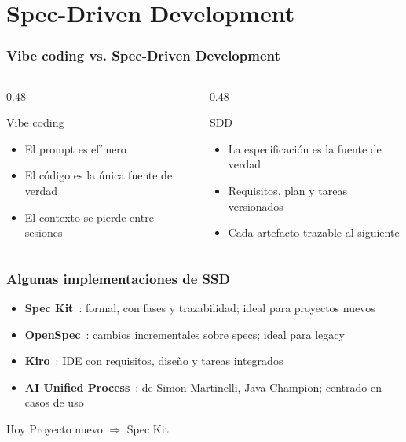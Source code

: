 \section[SDD]{Spec-Driven Development}

\begin{frame}
    \frametitle{Vibe coding vs. Spec-Driven Development}
    \begin{columns}[T]
        \begin{column}{0.48\textwidth}
            \begin{block}{Vibe coding}
                \begin{itemize}
                    \item El prompt es efímero
                    \item El código es la única fuente de verdad
                    \item El contexto se pierde entre sesiones
                \end{itemize}
            \end{block}
        \end{column}
        \begin{column}{0.48\textwidth}
            \begin{exampleblock}{SDD}
                \begin{itemize}
                    \item La especificación es la fuente de verdad
                    \item Requisitos, plan y tareas versionados
                    \item Cada artefacto trazable al siguiente
                \end{itemize}
            \end{exampleblock}
        \end{column}
    \end{columns}
\end{frame}

\begin{frame}
    \frametitle{Algunas implementaciones de SSD~\cite{Fowler2025SDD}}
    \begin{itemize}
        \item \textbf{Spec Kit}~\cite{SpecKit}: formal, con fases y trazabilidad; ideal para proyectos nuevos
        \item \textbf{OpenSpec}~\cite{OpenSpec}: cambios incrementales sobre specs; ideal para legacy
        \item \textbf{Kiro}~\cite{Kiro}: IDE con requisitos, diseño y tareas integrados
        \item \textbf{AI Unified Process}~\cite{AIUP}: de Simon Martinelli, Java Champion; centrado en casos de uso
    \end{itemize}
    \pause
    \begin{alertblock}{Hoy}
        Proyecto nuevo $\Rightarrow$ Spec Kit
    \end{alertblock}
\end{frame}
